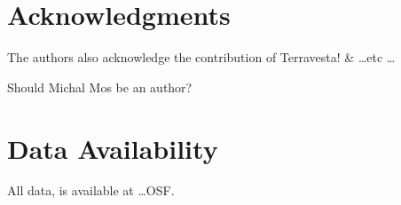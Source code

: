 \documentclass[fleqn, 15pt, lineno]{olplainarticle}
\begin{document}
\section{Acknowledgments}
The authors also acknowledge the contribution of Terravesta! \& \dots etc \dots

Should Michal Mos be an author?

\section{Data Availability}
All data, is available at \dots OSF.


\end{document}
